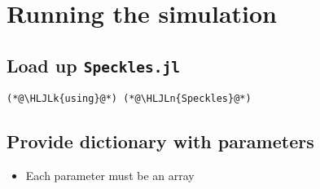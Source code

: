 \documentclass[12pt,a4paper]{article}
\newcommand{\HLJLk}[1]{\textcolor[RGB]{148,91,176}{\textbf{#1}}}
\newcommand{\HLJLn}[1]{#1}
\begin{document}
\section{Running the simulation}
\subsection{Load up \texttt{Speckles.jl}}

\begin{lstlisting}
(*@\HLJLk{using}@*) (*@\HLJLn{Speckles}@*)
\end{lstlisting}


\subsection{Provide dictionary with parameters}
\begin{itemize}
\item Each parameter must be an array

\end{itemize}
\end{document}
